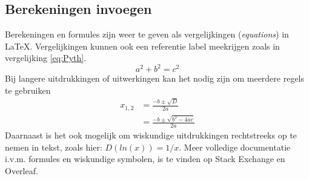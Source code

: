 \subsection{Berekeningen invoegen}
Berekeningen en formules zijn weer te geven als vergelijkingen (\textit{equations}) in \LaTeX. Vergelijkingen kunnen ook een referentie label meekrijgen zoals in vergelijking \eqref{eq:Pyth}.
\begin{equation}
    a^2 + b^2 = c^2
    \label{eq:Pyth}
\end{equation}
Bij langere uitdrukkingen of uitwerkingen kan het nodig zijn om meerdere regels te gebruiken
\begin{equation}
    \begin{split}
        x_{1,2} & = \frac{-b \pm \sqrt{D}}{2a} \\
                & = \frac{-b \pm \sqrt{b^2-4ac}}{2a}
    \end{split}
\end{equation}
Daarnaast is het ook mogelijk om wiskundige uitdrukkingen rechtstreeks op te nemen in tekst, zoals hier: $D(ln(x)) = 1/x$. Meer volledige documentatie i.v.m. formules en wiskundige symbolen, is te vinden op Stack Exchange en Overleaf.

